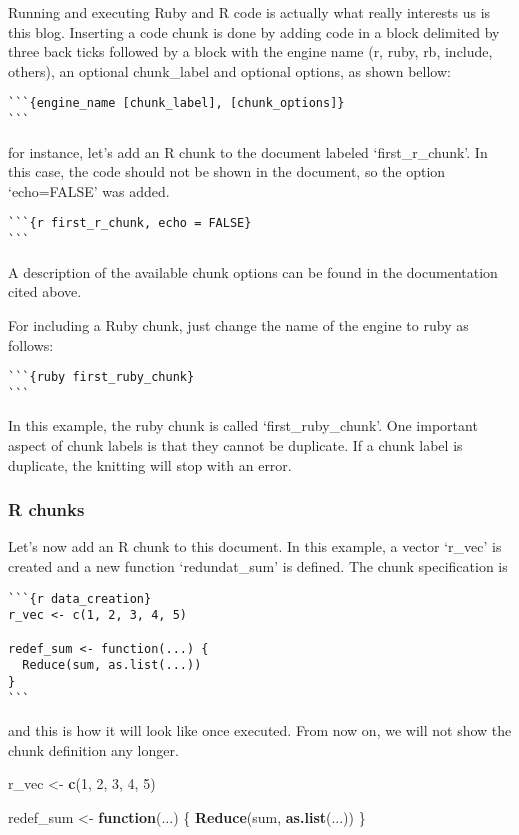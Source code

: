 \documentclass[]{article}
\newenvironment{Shaded}{\begin{snugshade}}{\end{snugshade}}
\newcommand{\KeywordTok}[1]{\textcolor[rgb]{0.13,0.29,0.53}{\textbf{#1}}}
\newcommand{\DecValTok}[1]{\textcolor[rgb]{0.00,0.00,0.81}{#1}}
\newcommand{\StringTok}[1]{\textcolor[rgb]{0.31,0.60,0.02}{#1}}
\newcommand{\ControlFlowTok}[1]{\textcolor[rgb]{0.13,0.29,0.53}{\textbf{#1}}}
\newcommand{\NormalTok}[1]{#1}
\begin{document}
Running and executing Ruby and R code is actually what really interests
us is this blog. Inserting a code chunk is done by adding code in a
block delimited by three back ticks followed by a block with the engine
name (r, ruby, rb, include, others), an optional chunk\_label and
optional options, as shown bellow:

\begin{verbatim}
```{engine_name [chunk_label], [chunk_options]}
```
\end{verbatim}

for instance, let's add an R chunk to the document labeled
`first\_r\_chunk'. In this case, the code should not be shown in the
document, so the option `echo=FALSE' was added.

\begin{verbatim}
```{r first_r_chunk, echo = FALSE}
```
\end{verbatim}

A description of the available chunk options can be found in the
documentation cited above.

For including a Ruby chunk, just change the name of the engine to ruby
as follows:

\begin{verbatim}
```{ruby first_ruby_chunk}
```
\end{verbatim}

In this example, the ruby chunk is called `first\_ruby\_chunk'. One
important aspect of chunk labels is that they cannot be duplicate. If a
chunk label is duplicate, the knitting will stop with an error.

\subsubsection{R chunks}\label{r-chunks}

Let's now add an R chunk to this document. In this example, a vector
`r\_vec' is created and a new function `redundat\_sum' is defined. The
chunk specification is

\begin{verbatim}
```{r data_creation}
r_vec <- c(1, 2, 3, 4, 5)

redef_sum <- function(...) {
  Reduce(sum, as.list(...))
}
```
\end{verbatim}

and this is how it will look like once executed. From now on, we will
not show the chunk definition any longer.

\begin{Shaded}
\begin{Highlighting}[]
\NormalTok{r_vec <-}\StringTok{ }\KeywordTok{c}\NormalTok{(}\DecValTok{1}\NormalTok{, }\DecValTok{2}\NormalTok{, }\DecValTok{3}\NormalTok{, }\DecValTok{4}\NormalTok{, }\DecValTok{5}\NormalTok{)}

\NormalTok{redef_sum <-}\StringTok{ }\ControlFlowTok{function}\NormalTok{(...) \{}
  \KeywordTok{Reduce}\NormalTok{(sum, }\KeywordTok{as.list}\NormalTok{(...))}
\NormalTok{\}}
\end{Highlighting}
\end{Shaded}
\end{document}
